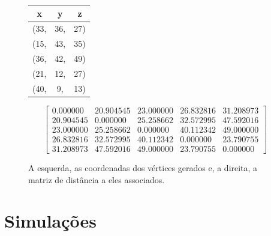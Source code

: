 \documentclass[a4paper,12pt]{report}
\begin{document}
	\begin{figure}[H]
	\begin{center}
		\begin{minipage}{0.15 \linewidth}
			\begin{table}[H]
				\centering
				\begin{tabular}{ |c c c| } 
					\hline
					\textbf{x} & \textbf{y} & \textbf{z} \\\hline
					(33, & 36, & 27)\\

					(15, & 43, & 35)\\

					(36, & 42, & 49)\\

					(21, & 12, & 27)\\

					(40, & 9, & 13)\\\hline

				\end{tabular}
				\label{tab:re1}
			\end{table}
		\end{minipage}
	\hspace{0.1cm}
		\begin{minipage}{0.8 \linewidth}
			\begin{equation*}
				\begin{bmatrix}
				 0.000000 & 20.904545 & 23.000000 & 26.832816 & 31.208973\\
	
				20.904545 & 0.000000 & 25.258662 & 32.572995 & 47.592016\\
	
				23.000000 & 25.258662 & 0.000000 & 40.112342 & 49.000000\\
	
				26.832816 & 32.572995 & 40.112342 & 0.000000 & 23.790755\\
	
				31.208973 & 47.592016 & 49.000000 & 23.790755 & 0.000000	
				\end{bmatrix}
			\end{equation*}
		\end{minipage}
	\end{center}
\caption{A esquerda, as coordenadas dos vértices gerados e, a direita, a matriz de distância a eles associados.}
\label{fig:inst}
\end{figure}
	
	\section{Simulações \label{sec:simulacoes}}
	
\end{document}
